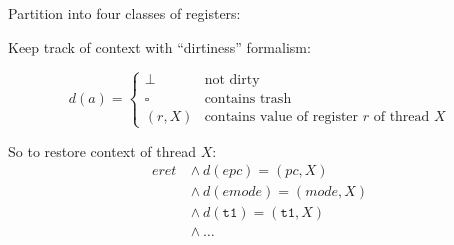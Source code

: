 \documentclass{beamer}
\begin{document}

	
	\newcommand\marktopleft[1]{%
		\tikz[overlay,remember picture] 
		\node (marker-#1-a) at (.4em,.1em) {};%
	}
	\newcommand\markbottomright[2]{%
		\tikz[overlay,remember picture] 
		\node (marker-#1-b) at (-.4em, .5em) {};%
		\tikz[overlay,remember picture,inner sep=3pt]
		\node[draw=#2,rounded corners,fit=(marker-#1-a.north west) (marker-#1-b.south east)] {};%
	}





\begin{frame}
Partition into four classes of registers:

{
	{\begin{center} 
	\end{center}}
	{\begin{center} 
\end{center}}}
{\begin{center} 
\end{center}}
\end{frame} 

\begin{frame} 
Keep track of context with ``dirtiness'' formalism:

\[ d(a) = \begin{cases} \bot & \text{not dirty} \\
\square & \text{contains trash} \\
(r,X) & \text{contains value of register $r$ of thread $X$}
\end{cases} \]

So to restore context of thread $X$:
\begin{align*}
eret \ &\land \ d(epc) = (pc,X) \ 
\\ &\land \ d(emode) = (mode,X) 
\\
&\land \ d(\texttt{t1}) = (\texttt{t1},X)
\\ &\land \ \ldots
\end{align*}
\end{frame} 
\end{document}
